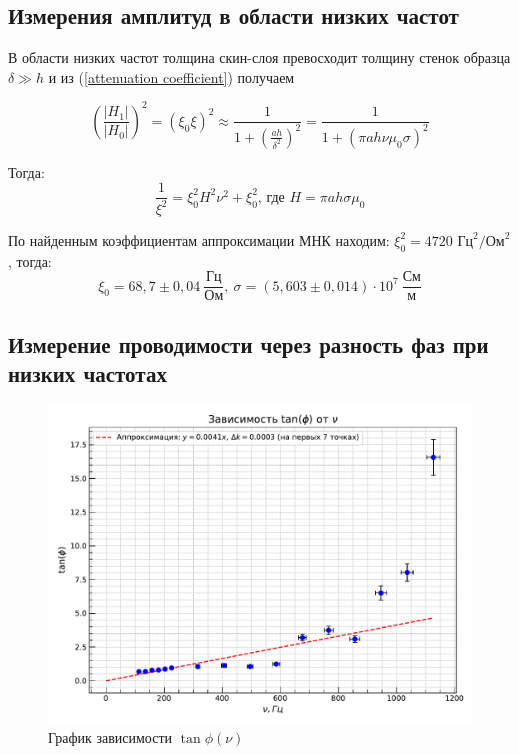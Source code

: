 \documentclass[a4paper, 12pt]{article} %
\begin{document}
\subsection{Измерения амплитуд в области низких частот}
	В области низких частот толщина скин-слоя превосходит толщину стенок образца $ \delta \gg h$  и из (\ref{attenuation coefficient}) получаем
    
	\begin{equation*}
		\left(\frac{|H_1|}{|H_0|}\right)^2 = (\xi_0\xi)^2 \approx \frac{1}{1+\left(\frac{ah}{\delta^2}\right)^2} = \frac{1}{1 + \left(\pi ah\nu\mu_0\sigma\right)^2}
	\end{equation*}
    
	Тогда: 
	\begin{equation*}
		\frac{1}{\xi^2}=\xi_0^2 H^2\nu^2 + \xi_0^2 \text{, где } H=\pi a h \sigma \mu_0
		\label{eq:liniya_dlya_c}
	\end{equation*}
    
	По найденным коэффициентам аппроксимации МНК находим: $\xi_0^2 = 4720 \text{ Гц}^2 / \text{Ом}^2$ , тогда:
	\[\xi_0 = 68,7 \pm 0,04 \ \frac{\text{Гц}}{\text{Ом}}, \ \sigma = (5,603 \pm 0,014) \cdot 10^7 \ \frac{\text{См}}{\text{м}}  \]
	
	\subsection{Измерение проводимости через разность фаз при низких частотах}

    \begin{figure}[h!]
    \centering
    \includegraphics[width=0.95\linewidth]{low frequencies.pdf}
    \caption{График зависимости $\tan{\phi} (\nu)$}
    \label{low frequencies}
    \end{figure}
        
\end{document}
